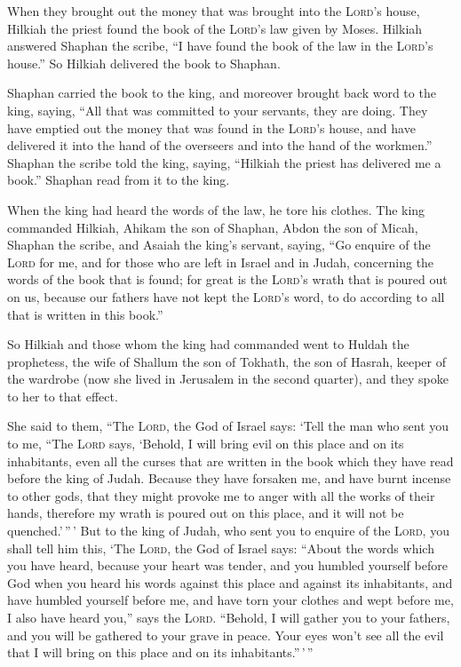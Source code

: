  When they brought out the money that was brought into
the \textsc{Lord}'s house, Hilkiah the priest found the book of the
\textsc{Lord}'s law given by Moses.  Hilkiah answered
Shaphan the scribe, ``I have found the book of the law in the
\textsc{Lord}'s house.'' So Hilkiah delivered the book to Shaphan.

 Shaphan carried the book to the king, and moreover
brought back word to the king, saying, ``All that was committed to your
servants, they are doing.  They have emptied out the
money that was found in the \textsc{Lord}'s house, and have delivered it
into the hand of the overseers and into the hand of the workmen.''
 Shaphan the scribe told the king, saying, ``Hilkiah the
priest has delivered me a book.'' Shaphan read from it to the king.

 When the king had heard the words of the law, he tore
his clothes.  The king commanded Hilkiah, Ahikam the son
of Shaphan, Abdon the son of Micah, Shaphan the scribe, and Asaiah the
king's servant, saying,  ``Go enquire of the
\textsc{Lord} for me, and for those who are left in Israel and in Judah,
concerning the words of the book that is found; for great is the
\textsc{Lord}'s wrath that is poured out on us, because our fathers have
not kept the \textsc{Lord}'s word, to do according to all that is
written in this book.''

 So Hilkiah and those whom the king had commanded went to
Huldah the prophetess, the wife of Shallum the son of Tokhath, the son
of Hasrah, keeper of the wardrobe (now she lived in Jerusalem in the
second quarter), and they spoke to her to that effect.

 She said to them, ``The \textsc{Lord}, the God of Israel
says: `Tell the man who sent you to me,  ``The
\textsc{Lord} says, `Behold, I will bring evil on this place and on its
inhabitants, even all the curses that are written in the book which they
have read before the king of Judah.  Because they have
forsaken me, and have burnt incense to other gods, that they might
provoke me to anger with all the works of their hands, therefore my
wrath is poured out on this place, and it will not be quenched.'\,''\,'
 But to the king of Judah, who sent you to enquire of the
\textsc{Lord}, you shall tell him this, `The \textsc{Lord}, the God of
Israel says: ``About the words which you have heard, 
because your heart was tender, and you humbled yourself before God when
you heard his words against this place and against its inhabitants, and
have humbled yourself before me, and have torn your clothes and wept
before me, I also have heard you,'' says the \textsc{Lord}.
 ``Behold, I will gather you to your fathers, and you
will be gathered to your grave in peace. Your eyes won't see all the
evil that I will bring on this place and on its inhabitants.''\,'\,''

